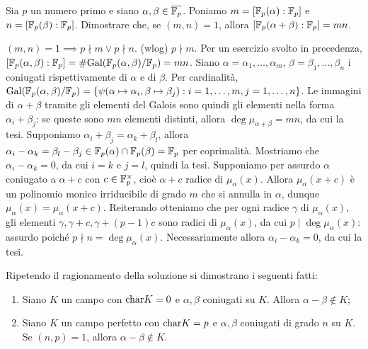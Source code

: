\begin{exercise}
    Sia $p$ un numero primo e siano $\alpha, \beta \in \overline{\mathbb{F}_p}$. Poniamo $m = [\mathbb{F}_p(\alpha) : \mathbb{F}_p]$ e $n = [\mathbb{F}_p(\beta) : \mathbb{F}_p]$. Dimostrare che, se $(m, n) = 1$, allora $[\mathbb{F}_p(\alpha + \beta) : \mathbb{F}_p] = mn$.
\end{exercise}
\begin{solution}
    $(m, n) = 1 \implies p \nmid m \lor p \nmid n$. (wlog) $p \nmid m$.
    Per un esercizio svolto in precedenza, $[\mathbb{F}_p(\alpha, \beta) : \mathbb{F}_p] = \#\text{Gal}(\mathbb{F}_p(\alpha, \beta) / \mathbb{F}_p) = mn$. Siano $\alpha = \alpha_1, \dots, \alpha_m$, $\beta = \beta_1, \dots, \beta_n$ i coniugati rispettivamente di $\alpha$ e di $\beta$. Per cardinalità, $\text{Gal}(\mathbb{F}_p(\alpha, \beta) / \mathbb{F}_p) = \{ \psi(\alpha \mapsto \alpha_i, \beta \mapsto \beta_j) : i = 1, \dots, m, j = 1, \dots, n \}$. Le immagini di $\alpha + \beta$ tramite gli elementi del Galois sono quindi gli elementi nella forma $\alpha_i + \beta_j$: se queste sono $mn$ elementi distinti, allora $\deg \mu_{\alpha + \beta} = mn$, da cui la tesi. Supponiamo
     $\alpha_i + \beta_j = \alpha_k + \beta_l$, allora $\alpha_i - \alpha_k = \beta_l - \beta_j \in \mathbb{F}_p(\alpha) \cap \mathbb{F}_p(\beta) = \mathbb{F}_p$ per coprimalità. Mostriamo che $\alpha_i - \alpha_k = 0$, da cui $i = k$ e $j = l$, quindi la tesi. Supponiamo per assurdo $\alpha$ coniugato a $\alpha + c$ con $c \in \mathbb{F}_p^\times$, cioè $\alpha + c$ radice di $\mu_\alpha(x)$. Allora $\mu_\alpha(x + c)$ è un polinomio monico irriducibile di grado $m$ che si annulla in $\alpha$, dunque $\mu_\alpha(x) = \mu_\alpha(x + c)$. Reiterando otteniamo che per ogni radice $\gamma$ di $\mu_\alpha(x)$, gli elementi $\gamma, \gamma + c, \gamma + (p-1)c$ sono radici di $\mu_\alpha(x)$, da cui $p \mid \deg \mu_\alpha(x)$: assurdo poiché $p \nmid n = \deg \mu_\alpha(x)$. Necessariamente allora $\alpha_i - \alpha_k = 0$, da cui la tesi.
\end{solution}

Ripetendo il ragionamento della soluzione si dimostrano i seguenti fatti:
\begin{enumerate}
    \item Siano $K$ un campo con $\text{char} K = 0$ e $\alpha, \beta$ coniugati su $K$. Allora $\alpha - \beta \notin K$;
    \item Siano $K$ un campo perfetto con $\text{char} K = p$ e $\alpha, \beta$ coniugati di grado $n$ su $K$. Se $(n, p) = 1$, allora $\alpha - \beta \notin K$.
\end{enumerate}